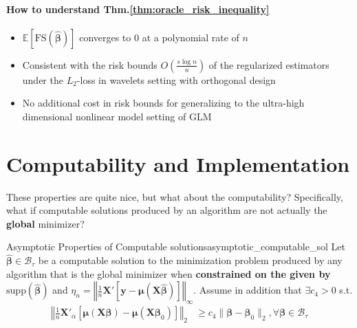 \documentclass[twoside]{article}
\begin{document}
\paragraph*{How to understand Thm.\ref{thm:oracle_risk_inequality}}
\begin{itemize}
    \item $\mathbb{E}\left[\mathrm{FS}\left(\hat{\boldsymbol{\beta}}\right)\right]$ converges to 0 at a polynomial rate of $n$
    \item Consistent with the risk bounds $O\left(\frac{s\log n}{n}\right)$ of the regularized estimators under the $L_2$-loss in wavelets setting with orthogonal design 
    \item No additional cost in risk bounds for generalizing to the ultra-high dimensional nonlinear model setting of GLM
\end{itemize}

\section{Computability and Implementation}
These properties are quite nice, but what about the computability? Specifically, what if computable solutions produced by an algorithm are not actually the \textbf{global} minimizer?
\begin{theorem}{Asymptotic Properties of Computable solutions}{asymptotic_computable_sol}
    Let $\hat{\boldsymbol{\beta}} \in \mathcal{B}_{\tau}$ be a computable solution to the minimization problem produced by any algorithm that is the global minimizer when \textbf{constrained on the  given by} $\mathrm{supp}\left( \hat{\boldsymbol{\beta}} \right)$ and $\eta_n =\left\Vert \frac{1}{n}\mathbf{X}'\left[\mathbf{y}-\boldsymbol{\mu}\left( \mathbf{X}\hat{\boldsymbol{\beta}} \right)\right] \right\Vert _{\infty}$.
    Assume in addition that $\exists c_4 >0$ s.t. 
    \begin{align*}
        \left\Vert \frac{1}{n}\mathbf{X}'_{\alpha}\left[ \boldsymbol{\mu}\left( \mathbf{X}\boldsymbol{\beta} \right)-\boldsymbol{\mu}\left( \mathbf{X}\boldsymbol{\beta}_0 \right)\right] \right\Vert _2 & \geq c_4 \lVert \boldsymbol{\beta}-\boldsymbol{\beta}_0\rVert _2,\forall \boldsymbol{\beta}\in\mathcal{B}_{\tau}
    \end{align*}
\end{theorem}

\newpage


\end{document}

